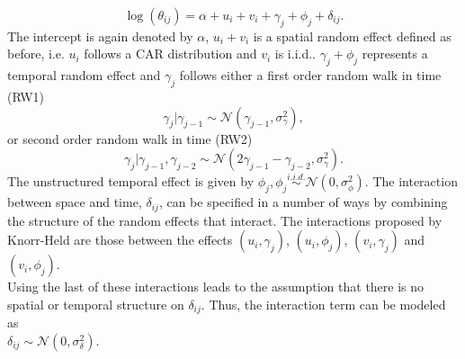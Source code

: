 \begin{equation}
    \log\left(\theta_{ij}\right)=\alpha+u_i+v_i+\gamma_j+\phi_j+\delta_{ij}.
\end{equation}
The intercept is again denoted by $\alpha$, $u_i + v_i$ is a spatial random effect defined as before, i.e. $u_i$ follows a CAR distribution and $v_i$ is i.i.d.. $\gamma_j+\phi_j$ represents a temporal random effect and $\gamma_j$ follows either a first order random walk in time (RW1)
\begin{equation}
    \gamma_j|\gamma_{j-1}\sim\mathcal{N}\left(\gamma_{j-1},\sigma_\gamma^2\right),
\end{equation}
or second order random walk in time (RW2)
\begin{equation}
    \gamma_j|\gamma_{j-1},\gamma_{j-2}\sim\mathcal{N}\left(2\gamma_{j-1}-\gamma_{j-2},\sigma_\gamma^2\right).
\end{equation}
The unstructured temporal effect is given by $\phi_j, \phi_j\overset{i.i.d.}{\sim}\mathcal{N}\left(0, \sigma_\phi^2\right)$. The interaction between space and time, $\delta_{ij}$, can be specified in a number of ways by combining the structure of the random effects that interact. The interactions proposed by Knorr-Held are those between the effects $\left(u_i,\gamma_j\right)$, $\left(u_i,\phi_j\right)$, $\left(v_i,\gamma_j\right)$ and $\left(v_i,\phi_j\right)$. \\
Using the last of these interactions leads to the assumption that there is no spatial or temporal structure on $\delta_{ij}$. Thus, the interaction term can be modeled as \\ $\delta_{ij}\sim\mathcal{N}\left(0,\sigma_\delta^2\right)$.
